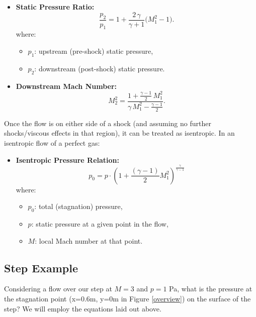 \documentclass[11pt]{article}
\begin{document}
\begin{itemize}
    \item \textbf{Static Pressure Ratio:}
    \begin{equation}
        \frac{p_2}{p_1} = 1 + \frac{2\,\gamma}{\gamma + 1} \bigl(M_1^2 - 1\bigr).
        \label{pressure_ratio}
    \end{equation}
    where:
    \begin{itemize}
        \item \( p_1 \): upstream (pre-shock) static pressure,
        \item \( p_2 \): downstream (post-shock) static pressure.
    \end{itemize}

    \item \textbf{Downstream Mach Number:}
    \begin{equation}
        M_2^2 = \frac{1 + \tfrac{\gamma - 1}{2}\,M_1^2}{\gamma\,M_1^2 - \tfrac{\gamma - 1}{2}}.
        \label{mach2equation}
    \end{equation}
\end{itemize}

Once the flow is on either side of a shock (and assuming no further shocks/viscous effects in that region), it can be treated as isentropic. In an isentropic flow of a perfect gas:
\begin{itemize}
    \item \textbf{Isentropic Pressure Relation: }
    \begin{equation}
      p_{0} = p\cdot(1+\dfrac{(\gamma - 1)}{2}M_{1}^{2})^{\frac{\gamma}{\gamma-1}}
      \label{isentropic_pressure}
   \end{equation}
   where:
   \begin{itemize}
       \item \( p_0 \): total (stagnation) pressure,
       \item \( p \): static pressure at a given point in the flow,
       \item \( M \): local Mach number at that point.
   \end{itemize}
\end{itemize}

\subsection{Step Example}
 Considering a flow over our step at $M=3$ and $p=1$ Pa, what is the pressure at the stagnation point (x=0.6m, y=0m in Figure \ref{overview}) on the surface of the step? We will employ the equations laid out above.
\vspace{2mm}
\end{document}
